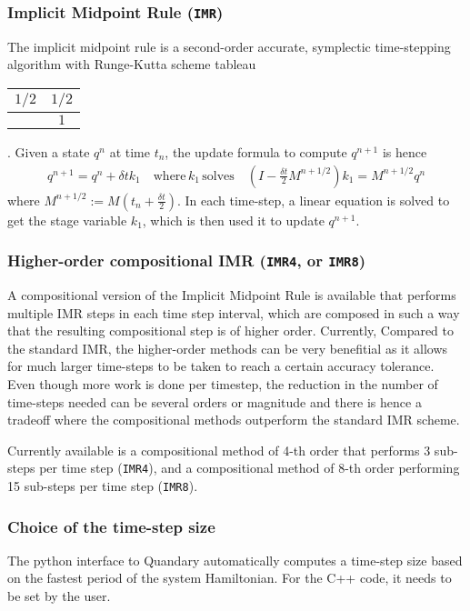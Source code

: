 \documentclass[11pt]{article}
\begin{document}
    \subsubsection{Implicit Midpoint Rule (\texttt{IMR})}
    The implicit midpoint rule is a second-order accurate, symplectic time-stepping algorithm with Runge-Kutta scheme tableau 
    \begin{tabular}{ c | c }
      $1/2$ & $ 1/2$ \\
      \hline
                &  $1$
    \end{tabular}.
    Given a state $q^n$ at time $t_n$, the update formula to compute $q^{n+1}$
    is hence 
    \begin{align}
      q^{n+1} = q^n + \delta t k_1 \quad \text{where} \, k_1 \, \text{solves}
      \quad \left( I-\frac{\delta t}{2} M^{n+1/2} \right) k_1 = M^{n+1/2}  q^n
    \end{align}
    where $M^{n+1/2} := M(t_n + \frac{\delta t}{2})$. In each time-step,
    a linear equation is solved to get the stage variable $k_1$, which is then used it
    to update $q^{n+1}$. 

    \subsubsection{Higher-order compositional IMR (\texttt{IMR4}, or \texttt{IMR8})}
    A compositional version of the Implicit Midpoint Rule is available that performs multiple IMR steps in each time step interval, which are composed in such a way that the resulting compositional step is of higher order. Currently, Compared to the standard IMR, the higher-order methods can be very benefitial as it allows for much larger time-steps to be taken to reach a certain accuracy tolerance. Even though more work is done per timestep, the reduction in the number of time-steps needed can be several orders or magnitude and there is hence a tradeoff where the compositional methods outperform the standard IMR scheme.

    Currently available is a compositional method of 4-th order that performs 3 sub-steps per time step (\texttt{IMR4}), and a compositional method of 8-th order performing 15 sub-steps per time step (\texttt{IMR8}).

    \subsubsection{Choice of the time-step size}
  The python interface to Quandary automatically computes a time-step size based on the fastest period of the system Hamiltonian. For the C++ code, it needs to be set by the user.
\end{document}
